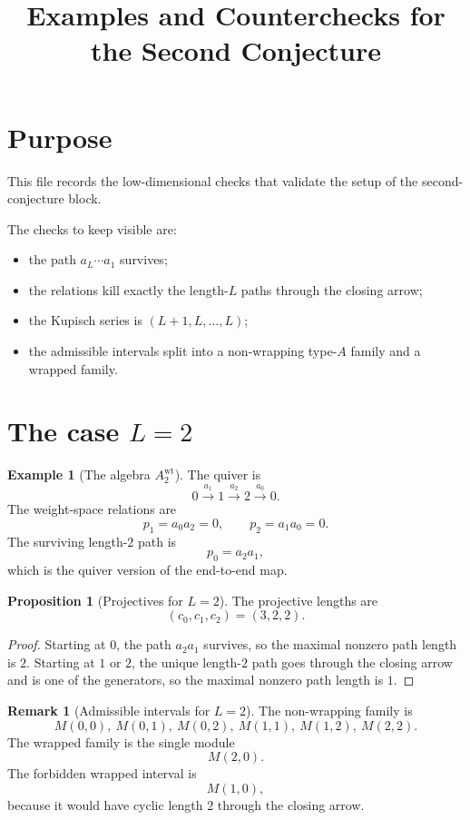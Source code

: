 \documentclass{article}
\title{Examples and Counterchecks for the Second Conjecture}
\date{}
\theoremstyle{definition}
\newtheorem{proposition}[theorem]{Proposition}
\newtheorem{remark}[theorem]{Remark}
\newtheorem{example}[theorem]{Example}
\begin{document}
\maketitle

\section{Purpose}

This file records the low-dimensional checks that validate the setup of the
second-conjecture block.

The checks to keep visible are:

\begin{itemize}
\item the path $a_L\cdots a_1$ survives;
\item the relations kill exactly the length-$L$ paths through the closing arrow;
\item the Kupisch series is $(L+1,L,\dots,L)$;
\item the admissible intervals split into a non-wrapping type-$A$ family and a
  wrapped family.
\end{itemize}

\section{The case $L=2$}

\begin{example}[The algebra $A_2^{\mathrm{wt}}$]
The quiver is
\[
0 \xrightarrow{a_1} 1 \xrightarrow{a_2} 2 \xrightarrow{a_0} 0.
\]
The weight-space relations are
\[
p_1=a_0a_2=0,
\qquad
p_2=a_1a_0=0.
\]
The surviving length-$2$ path is
\[
p_0=a_2a_1,
\]
which is the quiver version of the end-to-end map.
\end{example}

\begin{proposition}[Projectives for $L=2$]
The projective lengths are
\[
(c_0,c_1,c_2)=(3,2,2).
\]
\end{proposition}

\begin{proof}
Starting at $0$, the path $a_2a_1$ survives, so the maximal nonzero path length
is $2$.
Starting at $1$ or $2$, the unique length-$2$ path goes through the closing
arrow and is one of the generators, so the maximal nonzero path length is $1$.
\end{proof}

\begin{remark}[Admissible intervals for $L=2$]
The non-wrapping family is
\[
M(0,0),\ M(0,1),\ M(0,2),\ M(1,1),\ M(1,2),\ M(2,2).
\]
The wrapped family is the single module
\[
M(2,0).
\]
The forbidden wrapped interval is
\[
M(1,0),
\]
because it would have cyclic length $2$ through the closing arrow.
\end{remark}
\end{document}
